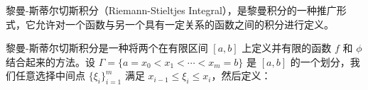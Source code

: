 
黎曼-斯蒂尔切斯积分（Riemann-Stieltjes Integral），是黎曼积分的一种推广形式，它允许对一个函数与另一个具有一定关系的函数之间的积分进行定义。

黎曼-斯蒂尔切斯积分是一种将两个在有限区间 $ [a, b] $ 上定义并有限的函数 $ f $ 和 $ \phi $ 结合起来的方法。设 $ \Gamma=\{a=x_{0}<x_{1}<\cdots<x_{m}=b\} $ 是 $ [a, b] $ 的一个划分，我们任意选择中间点 $ \{\xi_{i}\}_{i=1}^{m} $ 满足 $ x_{i-1}\leq\xi_{i}\leq x_{i} $，然后定义：


